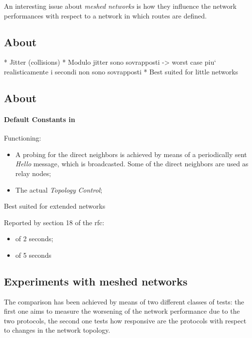 An interesting issue about \emph{meshed networks} is how they
influence the network performances with respect to a network in which
routes are defined.

\subsection{About \batman}

    * Jitter (collisions)
    * Modulo jitter sono sovrapposti -> worst case
        piu` realisticamente i secondi non sono sovrapposti
    * Best suited for little networks

\subsection{About \olsr}

    \paragraph{Default Constants in \olsr}

        Functioning:
        \begin{itemize}
        \item   A probing for the direct neighbors is achieved by means of
                a periodically sent \emph{Hello} message, which is
                broadcasted. Some of the direct neighbors are used as
                relay nodes;
        \item   The actual \emph{Topology Control};
        \end{itemize}

        Best suited for extended networks

        Reported by section 18 of the rfc:

        \begin{itemize}
        \item   {} of 2 seconds;
        \item   {} of 5 seconds
        \end{itemize}

\subsection{Experiments with meshed networks}

    The comparison has been achieved by means of two different classes
    of tests: the first one aims to measure the worsening of the network
    performance due to the two protocols, the second one tests how
    responsive are the protocols with respect to changes in the
    network topology.

